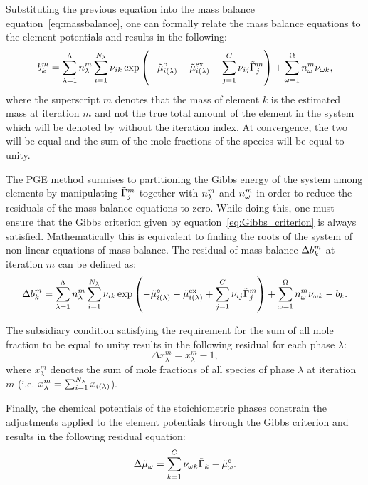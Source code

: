 Substituting the previous equation into the mass balance equation~\eqref{eq:massbalance}, one can formally relate the mass balance equations to the element potentials and results in the following:
    \begin{equation}
        \moleelem{k}^m = \sumsolnphase \molesol^m \sumspecies \stoich{i}{k} \exp{\left(-\pmgref{i} - \pmgex{i} +  \sumelements \stoich{i}{j} \cpe{j}^m\right)} + \sumstoichphase \molestoich^m \stoich{\omega}{k},
    \end{equation}
where the superscript $m$ denotes that the mass of element $k$ is the estimated mass at iteration $m$ and not the true total amount of the element in the system which will be denoted by  without the iteration index. At convergence, the two will be equal and the sum of the mole fractions of the species  will be equal to unity.

The PGE method surmises to partitioning the Gibbs energy of the system among elements by manipulating $\cpe{j}^m$ together with $\molesol^m$
and $\molestoich^m$ in order to reduce the residuals of the mass balance equations to zero. While doing this, one must ensure that the Gibbs criterion given by equation~\eqref{eq:Gibbs_criterion} is always satisfied. Mathematically this is equivalent to finding the roots of the system of non-linear equations of mass balance. The residual of mass balance $\Delta\moleelem{k}^m$ at iteration $m$ can be defined as:
    \begin{equation}\label{eq:residual_b}
        \Delta\moleelem{k}^m = \sumsolnphase \molesol^m \sumspecies \stoich{i}{k} \exp{\left(-\pmgref{i} - \pmgex{i} +  \sumelements \stoich{i}{j} \cpe{j}^m\right)} + \sumstoichphase \molestoich^m \stoich{\omega}{k} - \moleelem{k}.
    \end{equation}

The subsidiary condition satisfying the requirement for the sum of all mole fraction to be equal to unity results in the following residual for each phase $\lambda$:
    \begin{equation}\label{eq:residual_x}
        \Delta x_\lambda^m = x_\lambda^m - 1,
    \end{equation}
where $x_\lambda^m$ denotes the sum of mole fractions of all species of phase $\lambda$ at iteration $m$ (i.e. $x_\lambda^m = \sumspecies \molefrac{i}$).

Finally, the chemical potentials of the stoichiometric phases constrain the adjustments applied to the element potentials through the Gibbs criterion and results in the following residual equation:
    \begin{equation}\label{eq:residual_mu}
        \Delta\cpst = \sumelements[k] \stoich{\omega}{k} \cpe{k} - \pmgrefst.
    \end{equation}

